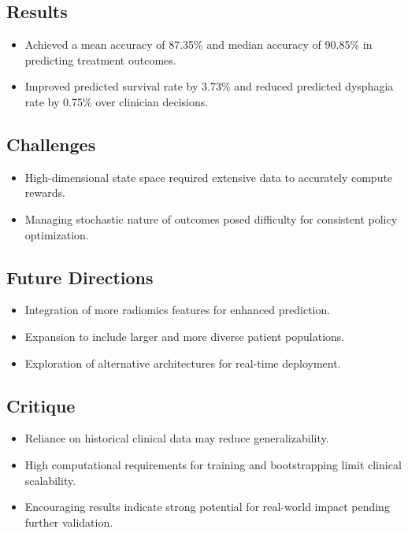 \subsection*{Results}
\begin{itemize}
    \item Achieved a mean accuracy of 87.35\% and median accuracy of 90.85\% in predicting treatment outcomes.
    \item Improved predicted survival rate by 3.73\% and reduced predicted dysphagia rate by 0.75\% over clinician decisions.
\end{itemize}

\subsection*{Challenges}
\begin{itemize}
    \item High-dimensional state space required extensive data to accurately compute rewards.
    \item Managing stochastic nature of outcomes posed difficulty for consistent policy optimization.
\end{itemize}

\subsection*{Future Directions}
\begin{itemize}
    \item Integration of more radiomics features for enhanced prediction.
    \item Expansion to include larger and more diverse patient populations.
    \item Exploration of alternative architectures for real-time deployment.
\end{itemize}

\subsection*{Critique}
\begin{itemize}
    \item Reliance on historical clinical data may reduce generalizability.
    \item High computational requirements for training and bootstrapping limit clinical scalability.
    \item Encouraging results indicate strong potential for real-world impact pending further validation.
\end{itemize}
